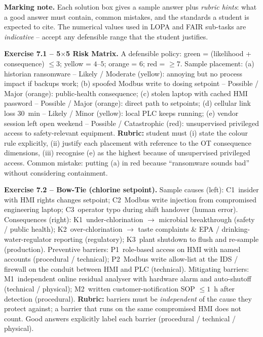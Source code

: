 \documentclass[11pt,a4paper]{article}
\begin{document}
\sheetheader

\noindent\textbf{Marking note.} Each solution box gives a sample answer plus
\emph{rubric hints}: what a good answer must contain, common mistakes, and the
standards a student is expected to cite. The numerical values used in LOPA and
FAIR sub-tasks are \emph{indicative} -- accept any defensible range that the
student justifies.

\vspace{0.6em}

\begin{solutionbox}
\textbf{Exercise 7.1 -- 5$\times$5 Risk Matrix.}
A defensible policy: green = (likelihood + consequence) $\le 3$;
yellow = $4$--$5$; orange = $6$; red = $\ge 7$. Sample placement:
(a) historian ransomware -- Likely / Moderate (yellow): annoying but no
process impact if backups work; (b) spoofed Modbus write to dosing
setpoint -- Possible / Major (orange): public-health consequence;
(c) stolen laptop with cached HMI password -- Possible / Major (orange):
direct path to setpoints; (d) cellular link loss 30~min -- Likely /
Minor (yellow): local PLC keeps running; (e) vendor session left open
weekend -- Possible / Catastrophic (red): unsupervised privileged access
to safety-relevant equipment.
\textbf{Rubric:} student must (i) state the colour rule explicitly,
(ii) justify each placement with reference to the OT consequence
dimensions, (iii) recognise (e) as the highest because of unsupervised
privileged access. Common mistake: putting (a) in red because
``ransomware sounds bad'' without considering containment.
\end{solutionbox}

\begin{solutionbox}
\textbf{Exercise 7.2 -- Bow-Tie (chlorine setpoint).}
Sample causes (left): C1~insider with HMI rights changes setpoint;
C2~Modbus write injection from compromised engineering laptop;
C3~operator typo during shift handover (human error).
Consequences (right): K1~under-chlorination $\to$ microbial breakthrough
(safety / public health); K2~over-chlorination $\to$ taste complaints \&
EPA / drinking-water-regulator reporting (regulatory); K3~plant shutdown
to flush and re-sample (production).
Preventive barriers: P1~role-based access on HMI with named accounts
(procedural / technical); P2~Modbus write allow-list at the IDS / firewall
on the conduit between HMI and PLC (technical).
Mitigating barriers: M1~independent online residual analyser with hardware
alarm and auto-shutoff (technical / physical); M2~written customer-notification
SOP $\le 1$~h after detection (procedural).
\textbf{Rubric:} barriers must be \emph{independent} of the cause they
protect against; a barrier that runs on the same compromised HMI does not
count. Good answers explicitly label each barrier (procedural / technical /
physical).
\end{solutionbox}
\end{document}
